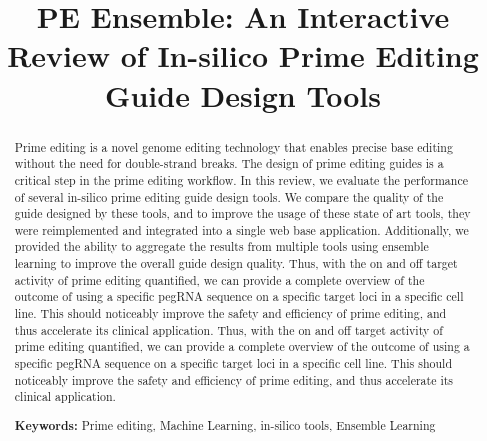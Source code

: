 \documentclass[12pt]{article}
\title{PE Ensemble: An Interactive Review of In-silico Prime Editing Guide Design Tools}
\begin{document}
\date{}
\maketitle

\begin{abstract}
    Prime editing is a novel genome editing technology that enables precise base editing without the need for double-strand breaks. The design of prime editing guides is a critical step in the prime editing workflow. In this review, we evaluate the performance of several in-silico prime editing guide design tools. We compare the quality of the guide designed by these tools, and to improve the usage of these state of art tools, they were reimplemented and integrated into a single web base application. Additionally, we provided the ability to aggregate the results from multiple tools using ensemble learning to improve the overall guide design quality.
    Thus, with the on and off target activity of prime editing quantified, we can provide a complete overview of the outcome of using a specific pegRNA sequence on a specific target loci in a specific cell line. This should noticeably improve the safety and efficiency of prime editing, and thus accelerate its clinical application.
    Thus, with the on and off target activity of prime editing quantified, we can provide a complete overview of the outcome of using a specific pegRNA sequence on a specific target loci in a specific cell line. This should noticeably improve the safety and efficiency of prime editing, and thus accelerate its clinical application.

    \textbf{Keywords:} Prime editing, Machine Learning, in-silico tools, Ensemble Learning
\end{abstract}

\newpage






\newpage
\appendix



\newpage
\printbibliography
\end{document}
